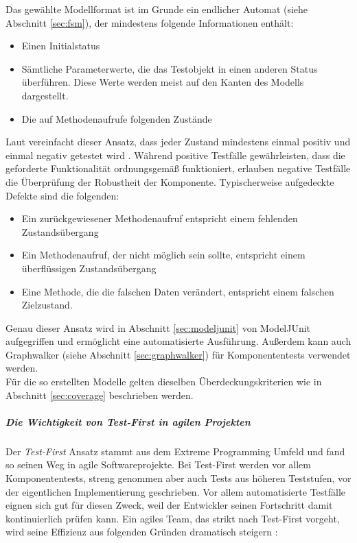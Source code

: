 Das gewählte Modellformat ist im Grunde ein endlicher Automat (siehe Abschnitt \ref{sec:fsm}), der mindestens folgende Informationen enthält:

\begin{itemize}
\item Einen Initialstatus
\item Sämtliche Parameterwerte, die das Testobjekt in einen anderen Status überführen. Diese Werte werden meist auf den Kanten des Modells dargestellt.
\item Die auf Methodenaufrufe folgenden Zustände
\end{itemize}

Laut \citeauthor{vigenschow_objektorientiertes_2004} vereinfacht dieser Ansatz, dass jeder Zustand mindestens einmal positiv und einmal negativ getestet wird \cite{vigenschow_objektorientiertes_2004}. Während positive Testfälle gewährleisten, dass die geforderte Funktionalität ordnungsgemäß funktioniert, erlauben negative Testfälle die Überprüfung der Robustheit der Komponente. Typischerweise aufgedeckte Defekte sind die folgenden:

\begin{itemize}
\item Ein zurückgewiesener Methodenaufruf entspricht einem fehlenden Zustandsübergang
\item Ein Methodenaufruf, der nicht möglich sein sollte, entspricht einem überflüssigen Zustandsübergang
\item Eine Methode, die die falschen Daten verändert, entspricht einem falschen Zielzustand.
\end{itemize}

Genau dieser Ansatz wird in Abschnitt \ref{sec:modeljunit} von ModelJUnit aufgegriffen und ermöglicht eine automatisierte Ausführung. Außerdem kann auch Graphwalker (siehe Abschnitt \ref{sec:graphwalker}) für Komponententests verwendet werden.\\
Für die so erstellten Modelle gelten dieselben Überdeckungskriterien wie in Abschnitt \ref{sec:coverage} beschrieben werden.

\subparagraph{Die Wichtigkeit von Test-First in agilen Projekten}  

Der \textit{Test-First} Ansatz stammt aus dem Extreme Programming Umfeld \cite{beck_extreme_2000} und fand so seinen Weg in agile Softwareprojekte. Bei Test-First werden vor allem Komponententests, streng genommen aber auch Tests aus höheren Teststufen, vor der eigentlichen Implementierung geschrieben. Vor allem automatisierte Testfälle eignen sich gut für diesen Zweck, weil der Entwickler seinen Fortschritt damit kontinuierlich prüfen kann. Ein agiles Team, das strikt nach Test-First vorgeht, wird seine Effizienz aus folgenden Gründen dramatisch steigern \cite{linz_testing_2014}:


